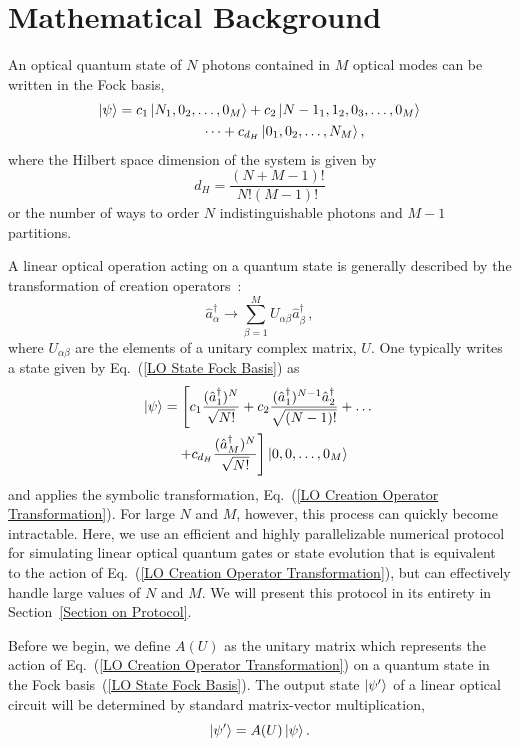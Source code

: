 \documentclass[aps,pra,twocolumn,superscriptaddress,floatfix,10pt]{revtex4}
\begin{document}
\section{Mathematical Background}
\label{Intro}
An optical quantum state of $N$ photons contained in $M$ optical modes can be written in the Fock basis,
\begin{eqnarray}
	\label{LO State Fock Basis}
	\ket{\psi} = c_1 \ket{N_1,0_2,\dots,0_M} + c_2 \ket{{N-1}_1,1_2,0_3,\dots, 0_M} \nonumber \\ \dots  + c_{d_H} \ket{0_1,0_2,\dots,N_M},	 \quad \quad \quad \quad
\end{eqnarray}
where the Hilbert space dimension of the system is given by
\begin{equation}
\label{Hilbert Space Dimension}
	d_H = \frac{(N+M-1)!}{N!(M-1)!}
\end{equation}
or the number of ways to order $N$ indistinguishable photons and $M-1$ partitions.

A linear optical operation acting on a quantum state is generally described by the transformation of creation operators~\cite{Review Paper,Reck}:
\begin{equation}
\label{LO Creation Operator Transformation}
\hat{a}^\dagger_\alpha \rightarrow \sum_{\beta=1}^{M} U_{\alpha\beta} \hat{a}^\dagger_\beta \,,
\end{equation}
where $U_{\alpha \beta}$ are the elements of a unitary complex matrix, $U$. One typically writes a state given by Eq.~(\ref{LO State Fock Basis}) as
\begin{eqnarray}
\ket{\psi} = \left[c_1 \frac{(\hat{a}^\dagger_1)^N}{\sqrt{N!}} + c_2 \frac{ (\hat{a}^\dagger_1)^{N-1} \hat{a}^\dagger_2}{\sqrt{(N-1)!}} + \dots \right.  \\*  \left.+ c_{d_H} \frac{(\hat{a}^\dagger_M)^N}{\sqrt{N!}}\right] \ket{0,0,\dots,0_M} \quad \quad \nonumber
\end{eqnarray}
and applies the symbolic transformation, Eq.~(\ref{LO Creation Operator Transformation}). For large $N$ and $M$, however, this process can quickly become intractable. Here, we use an efficient and highly parallelizable numerical protocol for simulating linear optical quantum gates or state evolution that is equivalent to the action of Eq.~(\ref{LO Creation Operator Transformation}), but can effectively handle large values of $N$ and $M$. We will present this protocol in its entirety in Section~\ref{Section on Protocol}.

Before we begin, we define $A(U)$ as the unitary matrix which represents the action of Eq.~(\ref{LO Creation Operator Transformation}) on a quantum state in the Fock basis~(\ref{LO State Fock Basis}). The output state $\ket{\psi^\prime}$ of a linear optical circuit will be determined by standard matrix-vector multiplication,
\begin{equation}
\label{Matrix Vector Product}
\ket{\psi^\prime} = A(U) \ket{\psi}.
\end{equation}
\end{document}
